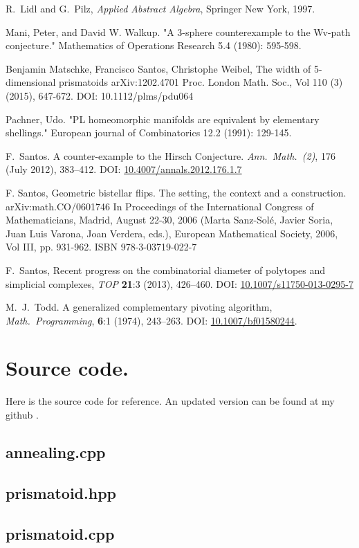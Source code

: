 \documentclass[12pt,a4paper]{article}
\theoremstyle{plain}
\theoremstyle{definition}
\begin{document}
\begin{thebibliography}{99}
R.~Lidl and G.~Pilz,
 \emph{Applied Abstract Algebra},
 Springer New York, 1997.

  Mani, Peter, and David W. Walkup. "A 3-sphere counterexample to the Wv-path conjecture." Mathematics of Operations Research 5.4 (1980): 595-598.

Benjamin Matschke, Francisco Santos, Christophe Weibel, The width of 5-dimensional prismatoids
arXiv:1202.4701
Proc. London Math. Soc., Vol 110 (3) (2015), 647-672. DOI: 10.1112/plms/pdu064

  Pachner, Udo. "PL homeomorphic manifolds are equivalent by elementary shellings." European journal of Combinatorics 12.2 (1991): 129-145.

  F.~Santos.
  A counter-example to the Hirsch Conjecture.
  \emph{Ann.~Math.~(2)}, 176 (July 2012), 383--412. 
  DOI: \href{http://dx.doi.org/10.4007/annals.2012.176.1.7}{10.4007/annals.2012.176.1.7}

F. Santos, Geometric bistellar flips. The setting, the context and a construction.
arXiv:math.CO/0601746
In Proceedings of the International Congress of Mathematicians, Madrid, August 22-30, 2006 (Marta Sanz-Solé, Javier Soria, Juan Luis Varona, Joan Verdera, eds.), European Mathematical Society, 2006, Vol III, pp. 931-962. ISBN 978-3-03719-022-7 

F.~Santos, Recent progress on the combinatorial diameter of polytopes and simplicial complexes,
\emph{TOP} {\bf 21}:3 (2013), 426--460. 
DOI: \href{http://dx.doi.org/10.1007/s11750-013-0295-7}{10.1007/s11750-013-0295-7}

M.~J.~Todd.
A generalized complementary pivoting algorithm,
\emph{Math.~Programming}, {\bf 6}:1 (1974), 243--263.
DOI:  \href{http://dx.doi.org/10.1007/BF01580244}{10.1007/bf01580244}.

\end{thebibliography}

\newpage
\appendix
\section{Source code.}
Here is the source code for reference. An updated version can be found at my github \cite{github}.
\subsection{annealing.cpp}

\subsection{prismatoid.hpp}

\subsection{prismatoid.cpp}

\end{document}
